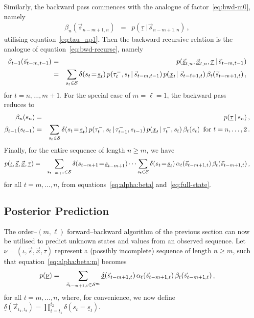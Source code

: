 \documentclass[a4paper]{article}
\newcommand{\uv}{\underline{\nu}}
\newcommand{\ui}{\underline{\iota}}
\newcommand{\ut}{\underline{\tau}}
\newcommand{\tm}{\tau^{-}}
\newcommand{\vs}{\vec{s}}
\newcommand{\uvs}{\underline{\vs}}
\newcommand{\vx}{\vec{x}}
\newcommand{\uvx}{\underline{\vx}}
\newcommand{\ux}{\underline{x}}
\newcommand{\us}{\underline{s}}
\newcommand{\ud}{\underline{\delta}}
\begin{document}
Similarly, the backward pass commences with the analogue of factor~\eqref{eq:bwd-m0},
namely
\begin{eqnarray}
\beta_n(\vs_{n-m+1,n}) & = & p(\ut\,|\,\vs_{n-m+1,n})\,,
\label{eq:beta_n:s}
\end{eqnarray}
utilising equation~\eqref{eq:tau_np1}. Then the backward recursive relation is the analogue
of equation~\eqref{eq:bwd-recurse}, namely
\begin{eqnarray}
\beta_{t-1}(\vs_{t-m,t-1}) & = & 
 p(\uvs_{t,n},\uvx_{t,n},\ut\,|\,\vs_{t-m,t-1})
\nonumber\\& = &
\sum_{s_{t}\in{\cal S}} \delta(s_{t}\!=\!\us_{t})\,
p(\tm_{t},s_{t}\,|\,\vs_{t-m,t-1})\,p(\ux_{t}\,|\,\vs_{t-\ell+1,t})\,\beta_{t}(\vs_{t-m+1,t})
\,,
\end{eqnarray}
for $t=n,\ldots,m+1$.
For the special case of $m=\ell=1$, the backward pass reduces to
\begin{eqnarray}
\beta_n(s_{n}) & = & p(\ut\,|\,s_{n})\,,
\nonumber\\
\beta_{t-1}(s_{t-1}) & = & 
\sum_{s_{t}\in{\cal S}} \delta(s_{t}\!=\!\us_{t})\,
p(\tm_{t},s_{t}\,|\,\tm_{t-1},s_{t-1})\,p(\ux_{t}\,|\,\tm_t,s_{t})\,\beta_{t}(s_{t})
\,\mbox{ for $t=n,\ldots,2$}
\,.
\end{eqnarray}
Finally, for the entire sequence of length $n\ge m$, we have
\begin{eqnarray}
p(\ui,\uvs,\uvx,\ut) & = &
\sum_{s_{t-m+1}\in{\cal S}} \delta(s_{t-m+1}\!=\!\us_{t-m+1})
\cdots\sum_{s_t\in{\cal S}} \delta(s_t\!=\!\us_t)
\,\alpha_t(\vs_{t-m+1,t})\,\beta_t(\vs_{t-m+1,t})\,,
\label{eq:alpha:beta:m}
\end{eqnarray}
for all $t=m,\ldots,n$,
from equations~\eqref{eq:alpha:beta} and~\eqref{eq:full-state}.

\subsection{Posterior Prediction}
The order--$(m,\ell)$ forward--backward algorithm of the previous section can now be utilised to predict unknown states and values
from an observed sequence.
Let $\uv=(\ui,\uvs,\uvx,\ut)$ represent a (possibly incomplete) sequence of length $n\ge m$, such that
equation~\eqref{eq:alpha:beta:m} becomes
\begin{eqnarray}
p(\uv) & = &
\sum_{\vs_{t-m+1,t}\in{\cal S}^{m}} \ud(\vs_{t-m+1,t})
\,\alpha_t(\vs_{t-m+1,t})\,\beta_t(\vs_{t-m+1,t})\,,
\end{eqnarray}
for all $t=m,\ldots,n$, where, for convenience, we now define 
$\ud(\vs_{t_1,t_2})=\prod_{t=t_1}^{t_2}\delta(s_t\!=\!\us_t)$.
\end{document}

